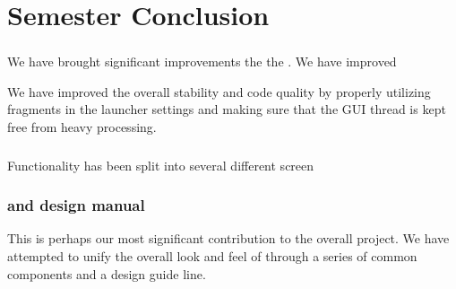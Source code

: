 \chapter{Semester Conclusion}
\label{cha:conclusion_final}

\subsection{\launcher}
We have brought significant improvements the the \launcher. We have improved 


We have improved the overall stability and code quality by properly utilizing fragments in the launcher settings and making sure that the GUI thread is kept free from heavy processing.   

\subsection{\ct}

Functionality has been split into several different screen

\subsection{\gc and design manual}

This is perhaps our most significant contribution to the overall project. We have attempted to unify the overall look and feel of \giraf through a series of common components and a design guide line. 